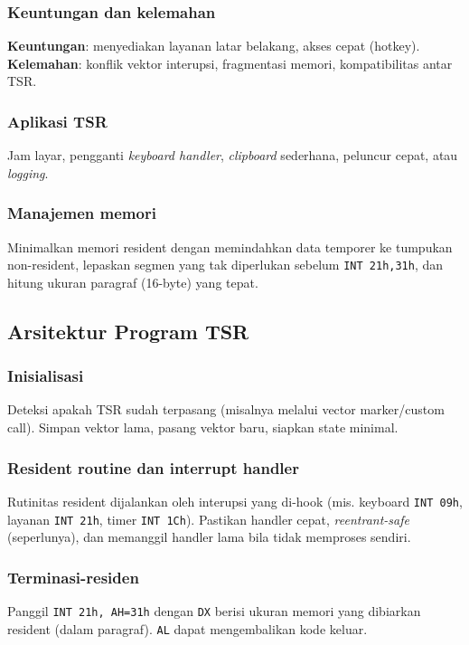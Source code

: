 \documentclass[../main.tex]{subfiles}
\begin{document}
        \subsubsection{Keuntungan dan kelemahan}
            \textbf{Keuntungan}: menyediakan layanan latar belakang, akses cepat (hotkey). \textbf{Kelemahan}: konflik vektor interupsi, fragmentasi memori, kompatibilitas antar TSR.

        \subsubsection{Aplikasi TSR}
            Jam layar, pengganti \textit{keyboard handler}, \textit{clipboard} sederhana, peluncur cepat, atau \textit{logging}.

        \subsubsection{Manajemen memori}
            Minimalkan memori resident dengan memindahkan data temporer ke tumpukan non-resident, lepaskan segmen yang tak diperlukan sebelum \texttt{INT 21h,31h}, dan hitung ukuran paragraf (16-byte) yang tepat.

        \subsection{Arsitektur Program TSR}
            \subsubsection{Inisialisasi}
                Deteksi apakah TSR sudah terpasang (misalnya melalui vector marker/custom call). Simpan vektor lama, pasang vektor baru, siapkan state minimal.

            \subsubsection{Resident routine dan interrupt handler}
                Rutinitas resident dijalankan oleh interupsi yang di-hook (mis. keyboard \texttt{INT 09h}, layanan \texttt{INT 21h}, timer \texttt{INT 1Ch}). Pastikan handler cepat, \textit{reentrant-safe} (seperlunya), dan memanggil handler lama bila tidak memproses sendiri.

            \subsubsection{Terminasi-residen}
                Panggil \texttt{INT 21h, AH=31h} dengan \texttt{DX} berisi ukuran memori yang dibiarkan resident (dalam paragraf). \texttt{AL} dapat mengembalikan kode keluar.
\end{document}
